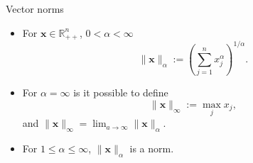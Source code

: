 \documentclass[10pt, handout]{beamer}
\begin{document}
\begin{frame}[label=Vector-Norms]{Vector norms \hyperlink{Category-Model}{\beamerreturnbutton}}
	\vfill
	\begin{itemize}
		\item For $\mathbf{x} \in \mathbb{R}^{n}_{++}$, $0 < \alpha < \infty$
				$$\|\mathbf{x}\|_{\alpha} := \left(\sum_{j=1}^{n} x_{j}^{\alpha} \right)^{1/\alpha}.$$
				\vfill
			
		\item For $\alpha = \infty$ is it possible to define
				$$\|\mathbf{x}\|_{\infty} := \max_{j} x_{j},$$
			and $\|\mathbf{x}\|_{\infty} = \lim_{a \to \infty} \|\mathbf{x}\|_{\alpha}$.
				\vfill
		
		\item For $1\leq \alpha \leq \infty$, $\|\mathbf{x}\|_{\alpha}$ is a norm.
	\end{itemize}
	\vfill

\end{frame}
\end{document}
